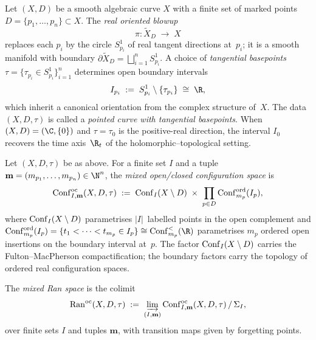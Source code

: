 \begin{definition}
\label{def:bordified-curve}
Let $(X,D)$ be a smooth algebraic curve $X$ with a finite set of
marked points $D = \{p_1,\ldots,p_n\} \subset X$. The \emph{real
oriented blowup}
\[
 \pi \colon \widetilde{X}_D \;\longrightarrow\; X
\]
replaces each $p_i$ by the circle $S^1_{p_i}$ of real tangent
directions at~$p_i$; it is a smooth manifold with boundary
$\partial \widetilde{X}_D = \bigsqcup_{i=1}^n S^1_{p_i}$. A choice
of \emph{tangential basepoints} $\tau = \{\tau_{p_i} \in
S^1_{p_i}\}_{i=1}^n$ determines open boundary intervals
\[
 I_{p_i} \;:=\; S^1_{p_i} \setminus \{\tau_{p_i}\}
 \;\cong\; \R,
\]
which inherit a canonical orientation from the complex structure
of~$X$. The data $(X,D,\tau)$ is called a \emph{pointed curve with
tangential basepoints}. When $(X,D) = (\C, \{0\})$ and $\tau = \tau_0$
is the positive-real direction, the interval $I_0$ recovers the
time axis~$\R_t$ of the holomorphic--topological setting.
\end{definition}

\begin{definition}
\label{def:mixed-config}
Let $(X,D,\tau)$ be as above. For a finite set $I$ and a tuple
$\mathbf{m} = (m_{p_1},\ldots,m_{p_n}) \in \N^n$, the
\emph{mixed open/closed configuration space} is
\[
 \mathrm{Conf}^{\mathrm{oc}}_{I,\mathbf{m}}(X, D, \tau)
 \;:=\;
 \mathrm{Conf}_I(X \setminus D)
 \;\times\;
 \prod_{p \in D} \mathrm{Conf}^{\mathrm{ord}}_{m_p}(I_p),
\]
where $\mathrm{Conf}_I(X \setminus D)$ parametrises $|I|$~labelled
points in the open complement and
$\Conf^{\mathrm{ord}}_{m_p}(I_p) = \{t_1 < \cdots < t_{m_p}
\in I_p\} \cong \Conf^{<}_{m_p}(\R)$ parametrises $m_p$ ordered
open insertions on the boundary interval at~$p$. The factor
$\mathrm{Conf}_I(X \setminus D)$ carries the Fulton--MacPherson
compactification; the boundary factors carry the topology of
ordered real configuration spaces.

The \emph{mixed Ran space} is the colimit
\[
 \mathrm{Ran}^{\mathrm{oc}}(X,D,\tau)
 \;:=\;
 \varinjlim_{(I,\mathbf{m})}
 \mathrm{Conf}^{\mathrm{oc}}_{I,\mathbf{m}}(X,D,\tau) \,/\, \Sigma_I,
\]
over finite sets $I$ and tuples $\mathbf{m}$, with transition maps
given by forgetting points.
\end{definition}

